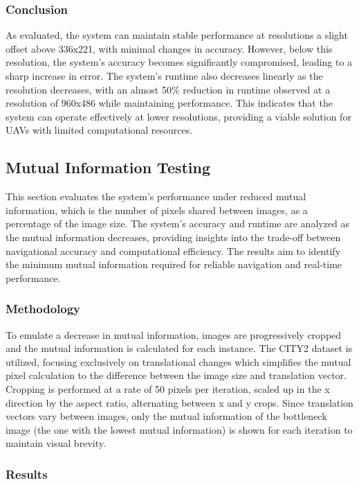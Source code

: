 \subsubsection{Conclusion}

As evaluated, the system can maintain stable performance at resolutions a slight offset above 336x221, with minimal changes in accuracy. However, below this resolution, the system's accuracy becomes significantly compromised, leading to a sharp increase in error. The system's runtime also decreases linearly as the resolution decreases, with an almost 50\% reduction in runtime observed at a resolution of 960x486 while maintaining performance. This indicates that the system can operate effectively at lower resolutions, providing a viable solution for UAVs with limited computational resources.


\subsection{Mutual Information Testing}

This section evaluates the system's performance under reduced mutual information, which is the number of pixels shared between images, as a percentage of the image size. The system's accuracy and runtime are analyzed as the mutual information decreases, providing insights into the trade-off between navigational accuracy and computational efficiency. The results aim to identify the minimum mutual information required for reliable navigation and real-time performance.

\subsubsection{Methodology}

To emulate a decrease in mutual information, images are progressively cropped and the mutual information is calculated for each instance. The CITY2 dataset is utilized, focusing exclusively on translational changes which simplifies the mutual pixel calculation to the difference between the image size and translation vector. Cropping is performed at a rate of 50 pixels per iteration, scaled up in the x direction by the aspect ratio, alternating between x and y crops. Since translation vectors vary between images, only the mutual information of the bottleneck image (the one with the lowest mutual information) is shown for each iteration to maintain visual brevity.

\subsubsection{Results}

